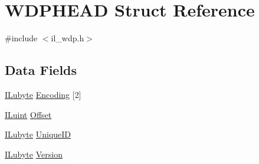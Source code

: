 \hypertarget{struct_w_d_p_h_e_a_d}{\section{W\-D\-P\-H\-E\-A\-D Struct Reference}
\label{struct_w_d_p_h_e_a_d}
}


{\ttfamily \#include $<$il\-\_\-wdp.\-h$>$}

\subsection*{Data Fields}
\begin{DoxyCompactItemize}
\item 
\hyperlink{il_8h_a8d2f04500100a86d1b00e98ab1b15a33}{I\-Lubyte} \hyperlink{struct_w_d_p_h_e_a_d_a9eddc985dcc65c530caea1476a9073e5}{Encoding} \mbox{[}2\mbox{]}
\item 
\hyperlink{il_8h_ac6508d0e9c19e32f32e00d54b5b8cf30}{I\-Luint} \hyperlink{struct_w_d_p_h_e_a_d_a3b5617e246c8182c704c5369dec7f049}{Offset}
\item 
\hyperlink{il_8h_a8d2f04500100a86d1b00e98ab1b15a33}{I\-Lubyte} \hyperlink{struct_w_d_p_h_e_a_d_ab1d7718bfc51d3608cb4af5ab2ebb785}{Unique\-I\-D}
\item 
\hyperlink{il_8h_a8d2f04500100a86d1b00e98ab1b15a33}{I\-Lubyte} \hyperlink{struct_w_d_p_h_e_a_d_adec36323c202074e86c4b4bbe1b0fca3}{Version}
\end{DoxyCompactItemize}


